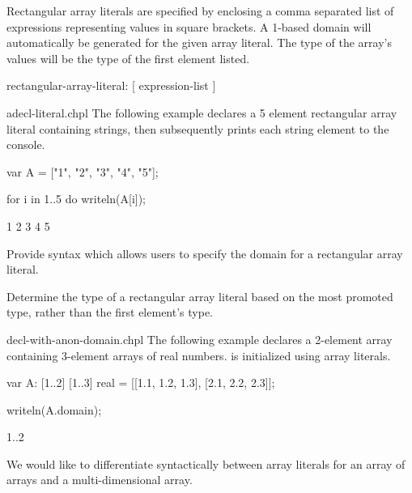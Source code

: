 Rectangular array literals are specified by enclosing a comma separated list of 
expressions representing values in square brackets. A 1-based domain will 
automatically be generated for the given array literal.  The type of the array's 
values will be the type of the first element listed.

\begin{syntax}
rectangular-array-literal:
  [ expression-list ]
\end{syntax}

\begin{chapelexample}{adecl-literal.chpl}
The following example declares a 5 element rectangular array literal 
containing strings, then subsequently prints each string element to the console.
\begin{chapel}
var A = ["1", "2", "3", "4", "5"];

for i in 1..5 do
  writeln(A[i]);
\end{chapel}
\begin{chapeloutput}
1
2
3
4
5
\end{chapeloutput}
\end{chapelexample}

\begin{future}
Provide syntax which allows users to specify the domain for a rectangular 
array literal.
\end{future}

\begin{future}
Determine the type of a rectangular array literal based on the most promoted 
type, rather than the first element's type.
\end{future}

\begin{chapelexample}{decl-with-anon-domain.chpl}
The following example declares a 2-element array  containing 3-element
arrays of real numbers.   is initialized using array literals.
\begin{chapel}
var A: [1..2] [1..3] real = [[1.1, 1.2, 1.3], [2.1, 2.2, 2.3]];
\end{chapel}
\begin{chapelpost}
writeln(A.domain);
\end{chapelpost}
\begin{chapeloutput}
{1..2}
\end{chapeloutput}
\end{chapelexample}

\begin{openissue}
We would like to differentiate syntactically between array literals for an array
of arrays and a multi-dimensional array. 
\end{openissue}

